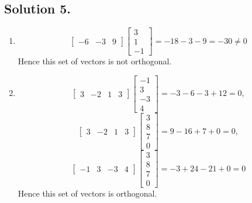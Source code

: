 \documentclass{article}
\begin{document}
\subsection*{Solution 5.}
\begin{enumerate}[label=(\arabic*)]
    \item 
    \[\left[\begin{array}{rrr}-6&-3&9\end{array}\right]\left[\begin{array}{r}3\\1\\-1\end{array}\right]=-18-3-9=-30\neq 0\]
    Hence this set of vectors is not orthogonal.
    \item
    \[\left[\begin{array}{rrrr}3&-2&1&3\end{array}\right]\left[\begin{array}{r}-1\\3\\-3\\4\end{array}\right]=-3-6-3+12=0,\]
    \[\left[\begin{array}{rrrr}3&-2&1&3\end{array}\right]\left[\begin{array}{r}3\\8\\7\\0\end{array}\right]=9-16+7+0=0,\]
    \[\left[\begin{array}{rrrr}-1&3&-3&4\end{array}\right]\left[\begin{array}{r}3\\8\\7\\0\end{array}\right]=-3+24-21+0=0\]
    Hence this set of vectors is orthogonal.
\end{enumerate}
\end{document}
